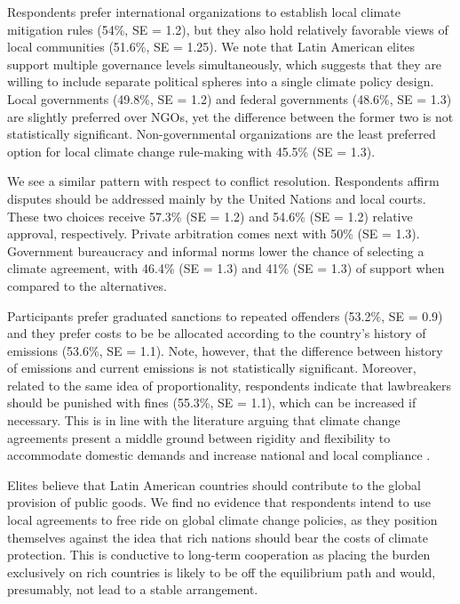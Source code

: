 \documentclass[a4paper,12pt]{article}
\begin{document}
Respondents prefer international organizations to establish local climate mitigation rules (54\%, SE = 1.2), but they also hold relatively favorable views of local communities (51.6\%, SE = 1.25). We note that Latin American elites support multiple governance levels simultaneously, which suggests that they are willing to include separate political spheres into a single climate policy design. Local governments (49.8\%, SE = 1.2) and federal governments (48.6\%, SE = 1.3) are slightly preferred over NGOs, yet the difference between the former two is not statistically significant. Non-governmental organizations are the least preferred option for local climate change rule-making with 45.5\% (SE = 1.3).

We see a similar pattern with respect to conflict resolution. Respondents affirm disputes should be addressed mainly by the United Nations and local courts. These two choices receive 57.3\% (SE = 1.2) and 54.6\% (SE = 1.2) relative approval, respectively. Private arbitration comes next with 50\% (SE = 1.3). Government bureaucracy and informal norms lower the chance of selecting a climate agreement, with 46.4\% (SE = 1.3) and 41\% (SE = 1.3) of support when compared to the alternatives.

Participants prefer graduated sanctions to repeated offenders (53.2\%, SE = 0.9) and they prefer costs to be be allocated according to the country's history of emissions (53.6\%, SE = 1.1). Note, however, that the difference between history of emissions and current emissions is not statistically significant. Moreover, related to the same idea of proportionality, respondents indicate that lawbreakers should be punished with fines (55.3\%, SE = 1.1), which can be increased if necessary. This is in line with the literature arguing that climate change agreements present a middle ground between rigidity and flexibility to accommodate domestic demands and increase national and local compliance \citep{von2008international}.

Elites believe that Latin American countries should contribute to the global provision of public goods. We find no evidence that respondents intend to use local agreements to free ride on global climate change policies, as they position themselves against the idea that rich nations should bear the costs of climate protection. This is conductive to long-term cooperation as placing the burden exclusively on rich countries is likely to be off the equilibrium path and would, presumably, not lead to a stable arrangement.
\end{document}
